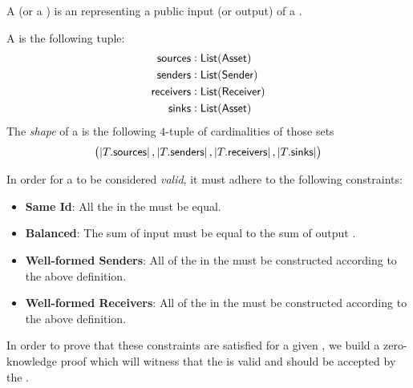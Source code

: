 \begin{definition}
    A \Source{} (or a \Sink{}) is an \Asset{} representing a public input (or output) of a \Transfer{}.
\end{definition}

\begin{definition}
    A \Transfer{} is the following tuple:
    \begin{align*}
        {\textsf{sources}}    &: {\textsf{List}}({\textsf{Asset}}) \\
        {\textsf{senders}}    &: {\textsf{List}}({\textsf{Sender}}) \\
        {\textsf{receivers}}  &: {\textsf{List}}({\textsf{Receiver}}) \\
        {\textsf{sinks}}      &: {\textsf{List}}({\textsf{Asset}})
    \end{align*}
    The \emph{shape} of a \Transfer{} is the following $4$-tuple of cardinalities of those sets
    \[\left(\left|T.{\textsf{sources}}\right|, \left|T.{\textsf{senders}}\right|, \left|T.{\textsf{receivers}}\right|, \left|T.{\textsf{sinks}}\right|\right)\]
\end{definition}

In order for a \Transfer{} to be considered \emph{valid}, it must adhere to the following constraints:

\begin{itemize}
    \item \textbf{Same Id}: All the  in the \Transfer{} must be equal.
    \item \textbf{Balanced}: The sum of input  must be equal to the sum of output .
    \item \textbf{Well-formed Senders}: All of the  in the \Transfer{} must be constructed according to the above \Sender{} definition.
    \item \textbf{Well-formed Receivers}: All of the  in the \Transfer{} must be constructed according to the above \Receiver{} definition.
\end{itemize}

In order to prove that these constraints are satisfied for a given \Transfer{}, we build a zero-knowledge proof which will witness that the \Transfer{} is valid and should be accepted by the \Ledger{}. 

